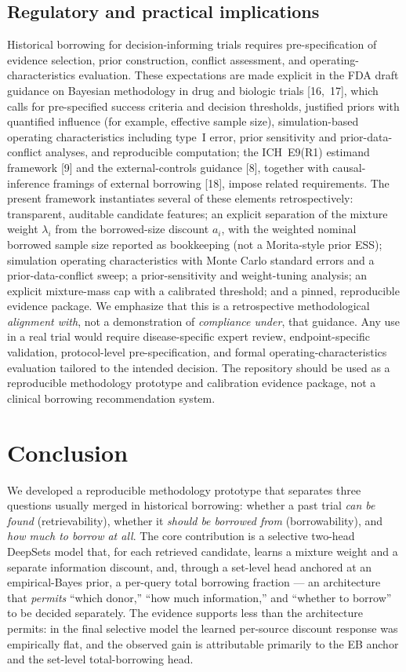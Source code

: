 \documentclass[11pt]{article}
\begin{document}
\subsection{Regulatory and practical implications}
Historical borrowing for decision-informing trials requires pre-specification
of evidence selection, prior construction, conflict assessment, and
operating-characteristics evaluation. These expectations are made explicit in
the FDA draft guidance on Bayesian methodology in drug and biologic trials
[16,~17], which calls for pre-specified success criteria and decision
thresholds, justified priors with quantified influence (for example, effective
sample size), simulation-based operating characteristics including type~I error,
prior sensitivity and prior-data-conflict analyses, and reproducible
computation; the ICH~E9(R1) estimand framework [9] and the external-controls
guidance [8], together with causal-inference framings of external borrowing
[18], impose related requirements. The present framework instantiates several
of these elements retrospectively: transparent, auditable candidate features; an
explicit separation of the mixture weight $\lambda_i$ from the
borrowed-size discount $a_i$, with the weighted nominal borrowed sample size
reported as bookkeeping (not a Morita-style prior ESS); simulation operating
characteristics with Monte Carlo standard errors and a prior-data-conflict
sweep; a prior-sensitivity and weight-tuning analysis; an explicit
mixture-mass cap with a calibrated threshold; and a pinned, reproducible
evidence package. We emphasize that this is
a retrospective methodological \emph{alignment with}, not a demonstration of
\emph{compliance under}, that guidance. Any use in a real trial would require
disease-specific expert review, endpoint-specific validation, protocol-level
pre-specification, and formal operating-characteristics evaluation tailored to
the intended decision. The repository should be used as a reproducible
methodology prototype and calibration evidence package, not a clinical borrowing
recommendation system.

\section{Conclusion}
We developed a reproducible methodology prototype that separates three
questions usually merged in historical borrowing: whether a past trial
\emph{can be found} (retrievability), whether it \emph{should be borrowed
from} (borrowability), and \emph{how much to borrow at all}. The core
contribution is a selective two-head DeepSets model that, for each retrieved
candidate, learns a mixture weight and a separate information discount, and,
through a set-level head anchored at an empirical-Bayes prior, a per-query
total borrowing fraction --- an architecture that \emph{permits} ``which
donor,'' ``how much information,''
and ``whether to borrow'' to be decided separately. The evidence supports
less than the architecture permits: in the final selective model the
learned per-source discount response was empirically flat, and the
observed gain is attributable primarily to the EB anchor and the
set-level total-borrowing head.
\end{document}
